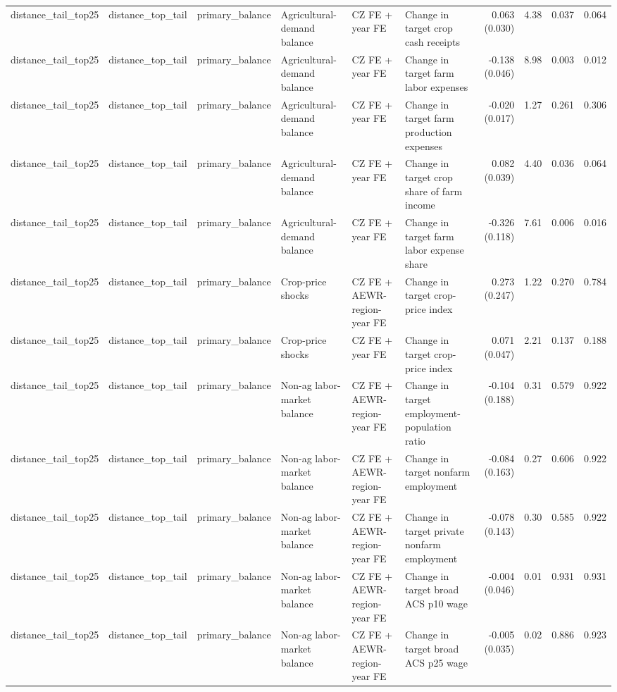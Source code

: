 \begin{tabular}{llllllrrrr}
distance_tail_top25 & distance_top_tail & primary_balance & Agricultural-demand balance & CZ FE + year FE & Change in target crop cash receipts & 0.063 (0.030) & 4.38 & 0.037 & 0.064 \\
distance_tail_top25 & distance_top_tail & primary_balance & Agricultural-demand balance & CZ FE + year FE & Change in target farm labor expenses & -0.138 (0.046) & 8.98 & 0.003 & 0.012 \\
distance_tail_top25 & distance_top_tail & primary_balance & Agricultural-demand balance & CZ FE + year FE & Change in target farm production expenses & -0.020 (0.017) & 1.27 & 0.261 & 0.306 \\
distance_tail_top25 & distance_top_tail & primary_balance & Agricultural-demand balance & CZ FE + year FE & Change in target crop share of farm income & 0.082 (0.039) & 4.40 & 0.036 & 0.064 \\
distance_tail_top25 & distance_top_tail & primary_balance & Agricultural-demand balance & CZ FE + year FE & Change in target farm labor expense share & -0.326 (0.118) & 7.61 & 0.006 & 0.016 \\
distance_tail_top25 & distance_top_tail & primary_balance & Crop-price shocks & CZ FE + AEWR-region-year FE & Change in target crop-price index & 0.273 (0.247) & 1.22 & 0.270 & 0.784 \\
distance_tail_top25 & distance_top_tail & primary_balance & Crop-price shocks & CZ FE + year FE & Change in target crop-price index & 0.071 (0.047) & 2.21 & 0.137 & 0.188 \\
distance_tail_top25 & distance_top_tail & primary_balance & Non-ag labor-market balance & CZ FE + AEWR-region-year FE & Change in target employment-population ratio & -0.104 (0.188) & 0.31 & 0.579 & 0.922 \\
distance_tail_top25 & distance_top_tail & primary_balance & Non-ag labor-market balance & CZ FE + AEWR-region-year FE & Change in target nonfarm employment & -0.084 (0.163) & 0.27 & 0.606 & 0.922 \\
distance_tail_top25 & distance_top_tail & primary_balance & Non-ag labor-market balance & CZ FE + AEWR-region-year FE & Change in target private nonfarm employment & -0.078 (0.143) & 0.30 & 0.585 & 0.922 \\
distance_tail_top25 & distance_top_tail & primary_balance & Non-ag labor-market balance & CZ FE + AEWR-region-year FE & Change in target broad ACS p10 wage & -0.004 (0.046) & 0.01 & 0.931 & 0.931 \\
distance_tail_top25 & distance_top_tail & primary_balance & Non-ag labor-market balance & CZ FE + AEWR-region-year FE & Change in target broad ACS p25 wage & -0.005 (0.035) & 0.02 & 0.886 & 0.923 \\

\end{tabular}
